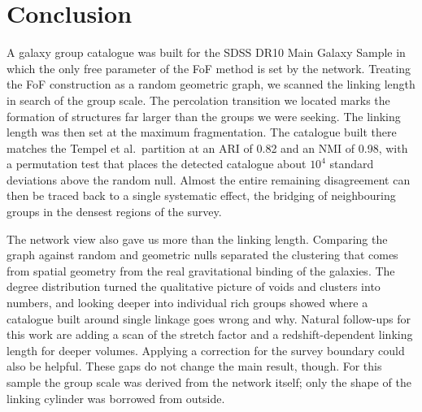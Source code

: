 \documentclass[9pt,a4paper,twocolumn,twoside]{rho-class/rho}
\begin{document}
\clearpage

\section{Conclusion}

A galaxy group catalogue was built for the SDSS DR10 Main Galaxy Sample in
which the only free parameter of the FoF method is set by the
network. Treating the FoF construction as a random geometric graph, we scanned
the linking length in search of the group scale. The percolation
transition we located marks the formation of structures far larger than the
groups we were seeking. The
linking length was then set at the maximum fragmentation. The catalogue built
there matches the Tempel et al.\ partition at an ARI of 0.82 and an NMI of 0.98,
with a permutation test that places the detected catalogue about $10^4$ standard deviations
above the random null.
Almost the entire remaining disagreement can then be traced back to a single
systematic effect, the bridging of neighbouring groups in the densest regions of the
survey.

The network view also gave us more than the linking length. Comparing the
graph against random and geometric nulls separated the clustering that comes
from spatial geometry from the real gravitational binding of the galaxies. The
degree distribution turned the qualitative picture of voids and clusters
into numbers, and looking deeper into individual rich groups showed where a
catalogue built around single linkage goes wrong and why. Natural follow-ups for this
work are adding a scan of the stretch factor and a redshift-dependent linking
length for deeper volumes. Applying a correction for the survey boundary could also
be helpful. These gaps do not change the main result, though. For this sample
the group scale was derived from the network itself; only the shape of the
linking cylinder was borrowed from outside.


\newpage

\printbibliography

\end{document}
